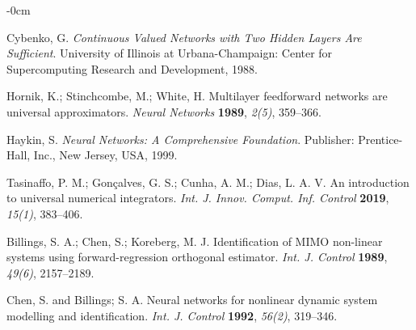 \documentclass[journal,article,submit,pdftex,moreauthors]{Definitions/mdpi}
\begin{document}
\begin{adjustwidth}{-\extralength}{0cm}



%

\begin{thebibliography}{999}

Cybenko, G. \textit{Continuous Valued Networks with Two Hidden Layers Are Sufficient}. University of Illinois at Urbana-Champaign: Center for Supercomputing Research and Development, 1988.

Hornik, K.; Stinchcombe, M.; White, H. Multilayer feedforward networks are universal approximators. {\em Neural Networks} {\bf 1989}, {\em 2(5)}, 359--366.

Haykin, S. \textit{Neural Networks: A Comprehensive Foundation}. Publisher: Prentice-Hall, Inc., New Jersey, USA, 1999.

Tasinaffo, P. M.; Gonçalves, G. S.; Cunha, A. M.; Dias, L. A. V. An introduction to universal numerical integrators. {\em Int. J. Innov. Comput. Inf. Control} {\bf 2019}, {\em 15(1)}, 383--406.

Billings, S. A.; Chen, S.; Koreberg, M. J. Identification of {MIMO} non-linear systems using forward-regression orthogonal estimator. {\em Int. J. Control} {\bf 1989}, {\em 49(6)}, 2157--2189.

Chen, S. and Billings; S. A. Neural networks for nonlinear dynamic system modelling and identification. {\em Int. J. Control} {\bf 1992}, {\em 56(2)}, 319--346.


\end{thebibliography}
\end{adjustwidth}
\end{document}

